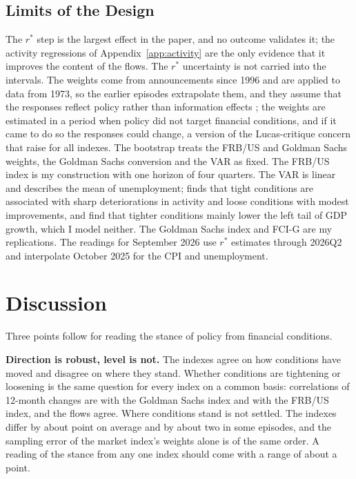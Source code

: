\documentclass[11pt]{article}
\newcommand{\rs}{r^{*}}
\begin{document}
\subsection{Limits of the Design}\label{sec:limits}
The $\rs$ step is the largest effect in the paper, and no outcome validates it; the activity regressions of Appendix~\ref{app:activity} are the only evidence that it improves the content of the flows. The $\rs$ uncertainty is not carried into the intervals. The weights come from announcements since 1996 and are applied to data from 1973, so the earlier episodes extrapolate them, and they assume that the responses reflect policy rather than information effects \citep{nakamura2018}; the weights are estimated in a period when policy did not target financial conditions, and if it came to do so the responses could change, a version of the Lucas-critique concern that \citet{hatzius2010} raise for all indexes. The bootstrap treats the FRB/US and Goldman Sachs weights, the Goldman Sachs conversion and the VAR as fixed. The FRB/US index is my construction with one horizon of four quarters. The VAR is linear and describes the mean of unemployment; \citet{kiley2020ml} finds that tight conditions are associated with sharp deteriorations in activity and loose conditions with modest improvements, and \citet{adrian2019} find that tighter conditions mainly lower the left tail of GDP growth, which I model neither. The Goldman Sachs index and FCI-G are my replications. The readings for September 2026 use $\rs$ estimates through 2026Q2 and interpolate October 2025 for the CPI and unemployment.
\FloatBarrier

\section{Discussion}\label{sec:discussion}
Three points follow for reading the stance of policy from financial conditions.

\textbf{Direction is robust, level is not.} The indexes agree on how conditions have moved and disagree on where they stand. Whether conditions are tightening or loosening is the same question for every index on a common basis: correlations of 12-month changes are  with the Goldman Sachs index and  with the FRB/US index, and the flows agree. Where conditions stand is not settled. The indexes differ by about  point on average and by about two in some episodes, and the sampling error of the market index's weights alone is of the same order. A reading of the stance from any one index should come with a range of about a point.
\end{document}
